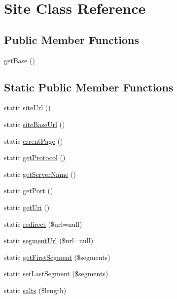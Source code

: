 \hypertarget{class_zest_1_1_site_1_1_site}{}\section{Site Class Reference}
\label{class_zest_1_1_site_1_1_site}
\subsection*{Public Member Functions}
\begin{DoxyCompactItemize}
\item 
\mbox{\hyperlink{class_zest_1_1_site_1_1_site_aeab69f6d8e0e9bae67e8289ca500d917}{get\+Base}} ()
\end{DoxyCompactItemize}
\subsection*{Static Public Member Functions}
\begin{DoxyCompactItemize}
\item 
static \mbox{\hyperlink{class_zest_1_1_site_1_1_site_aabc6eeb791614306ddd00c2a7e4401ba}{site\+Url}} ()
\item 
static \mbox{\hyperlink{class_zest_1_1_site_1_1_site_a8f8d8d6d234b523abdc96f6a24339485}{site\+Base\+Url}} ()
\item 
static \mbox{\hyperlink{class_zest_1_1_site_1_1_site_a402779c51eaf3f201998b92eef6ea24b}{crrent\+Page}} ()
\item 
static \mbox{\hyperlink{class_zest_1_1_site_1_1_site_a49b97a960756063eb0674116b149d3a1}{get\+Protocol}} ()
\item 
static \mbox{\hyperlink{class_zest_1_1_site_1_1_site_ad690e1e46ca1b9bf7e1edcc19d35cc0b}{get\+Server\+Name}} ()
\item 
static \mbox{\hyperlink{class_zest_1_1_site_1_1_site_a473a5a7e8017b36555076b2b2fe7a70c}{get\+Port}} ()
\item 
static \mbox{\hyperlink{class_zest_1_1_site_1_1_site_a58ea02df7d1051bed92f73fc3a87772c}{get\+Uri}} ()
\item 
static \mbox{\hyperlink{class_zest_1_1_site_1_1_site_a42b47107f2c916b4cad673709d8d6eb6}{redirect}} (\$url=null)
\item 
static \mbox{\hyperlink{class_zest_1_1_site_1_1_site_a0f6ab5f2dc1ad4b3ef7ca9251e63c777}{segment\+Url}} (\$url=null)
\item 
static \mbox{\hyperlink{class_zest_1_1_site_1_1_site_ac976b29a145a0f1cbc24d0646d5045b2}{get\+First\+Segment}} (\$segments)
\item 
static \mbox{\hyperlink{class_zest_1_1_site_1_1_site_a3ffc4def9857eea2fbffd7c7c9b3de20}{set\+Last\+Segment}} (\$segments)
\item 
static \mbox{\hyperlink{class_zest_1_1_site_1_1_site_ad2f560b79e6c8bcd9573904aa4fee525}{salts}} (\$length)
\end{DoxyCompactItemize}



